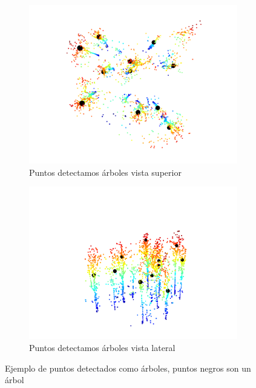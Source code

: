\begin{figure}[h]
  \begin{subfigure}{0.5\textwidth}
    \centering
    \includegraphics[width=0.8\linewidth]{imaxes/detecsup.png}
    \caption{Puntos detectamos árboles vista superior}
    \label{fig:last1}
  \end{subfigure}%
  \begin{subfigure}{0.5\textwidth}
    \centering
    \includegraphics[width=0.8\linewidth]{imaxes/deteclat.png}
    \caption{Puntos detectamos árboles vista lateral}
    \label{fig:last}
  \end{subfigure}
  \caption{Ejemplo de puntos detectados como árboles, puntos negros son un árbol}
  \label{fig:algo2}
\end{figure}

